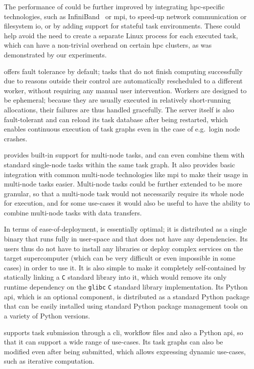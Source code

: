 \begin{description}[wide=0pt]
		The performance of \hyperqueue{} could be further improved by integrating
		\gls{hpc}-specific technologies, such as InfiniBand~\cite{infiniband} or
		\gls{mpi}, to speed-up network communication or filesystem
		\gls{io}, or by adding support for stateful task environments. These could help
		avoid the need to create a separate Linux process for each executed task, which can have a
		non-trivial overhead on certain \gls{hpc} clusters, as was demonstrated by our
		experiments.
	\item[Fault tolerance] \hyperqueue{} offers fault tolerance by default; tasks that do not
		finish computing successfully due to reasons outside their control are automatically rescheduled to
		a different worker, without requiring any manual user intervention. Workers are designed to be
		ephemeral; because they are usually executed in relatively short-running allocations, their
		failures are thus handled gracefully. The server itself is also fault-tolerant and can reload its
		task database after being restarted, which enables continuous execution of task graphs even in the
		case of e.g.\ login node crashes.
	\item[Multi-node tasks] \hyperqueue{} provides built-in support for multi-node tasks, and
		can even combine them with standard single-node tasks within the same task graph. It also provides
		basic integration with common multi-node technologies like \gls{mpi} to make their
		usage in multi-node tasks easier. Multi-node tasks could be further extended to be more granular,
		so that a multi-node task would not necessarily require its whole node for execution, and for some
		use-cases it would also be useful to have the ability to combine multi-node tasks with data
		transfers.
	\item[Deployment] In terms of ease-of-deployment, \hyperqueue{} is essentially optimal; it is
		distributed as a single binary that runs fully in user-space and that does not have any
		dependencies. Its users thus do not have to install any libraries or deploy complex services on the
		target supercomputer (which can be very difficult or even impossible in some cases) in order to use
		it. It is also simple to make it completely self-contained by statically linking a
		\texttt{C} standard library into it, which would remove its only runtime dependency
		on the \texttt{glibc} \texttt{C} standard library implementation. Its
		Python \gls{api}, which is an optional component, is distributed as a standard
		Python package that can be easily installed using standard Python package management tools on a
		variety of Python versions.
	\item[Programming model] \hyperqueue{} supports task submission through a \gls{cli},
		workflow files and also a Python \gls{api}, so that it can support a wide range of
		use-cases. Its task graphs can also be modified even after being submitted, which allows expressing
		dynamic use-cases, such as iterative computation.


\end{description}
